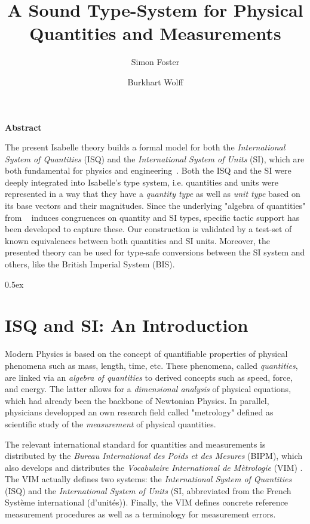 \documentclass[11pt,a4paper]{book}
\begin{document}
\title{A Sound Type-System for Physical Quantities and Measurements}
\author{Simon Foster \and Burkhart Wolff}
\maketitle

\textbf{ Abstract } 

The present Isabelle theory builds a formal model for both the \emph{International System of Quantities}
(ISQ) and the \emph{International System of Units} (SI), which are both fundamental for physics
and engineering~\cite{bipm-jcgm:2012:VIM}. Both the ISQ and the SI were deeply integrated into 
Isabelle's type system, i.e. quantities and units were represented in a way that 
they have a  \emph{quantity type} as well as \emph{unit type} based on its base vectors and their 
magnitudes. Since the underlying "algebra of quantities" from ~\cite{bipm-jcgm:2012:VIM} induces 
congruences on  quantity and SI types, specific tactic support has been developed to capture these.
Our construction is validated by a test-set of known equivalences between both quantities and SI units.
Moreover, the presented theory can be used for type-safe conversions between the SI system and
others, like the British Imperial System (BIS).

\tableofcontents

\parindent 0pt\parskip 0.5ex


\chapter{ISQ and SI: An Introduction}

Modern Physics is based on the concept of quantifiable properties of physical phenomena such 
as mass, length, time, etc. These phenomena, called \emph{quantities}, are linked via an 
\emph{algebra of quantities} to derived concepts such as speed, force, and energy. The latter 
allows for a \emph{dimensional analysis} of physical equations, which had already been the 
backbone of Newtonian Physics. In parallel, physicians developped an own research field called 
"metrology" defined as scientific study of the \emph{measurement} of physical quantities.


The relevant international standard for quantities and measurements is distributed by the
\emph{Bureau International des Poids et des Mesures} (BIPM), which also develops and distributes
the \emph{Vocabulaire International de M\`etrologie} (VIM) \cite{bipm-jcgm:2012:VIM}.
The VIM actually defines two systems: the \emph{International System of Quantities}
(ISQ) and the \emph{International System of Units} (SI, abbreviated from the French  Syst\`eme 
international (d’unit\'es)). Finally, the VIM defines concrete reference measurement procedures 
as well as a terminology for measurement errors. 
\end{document}
